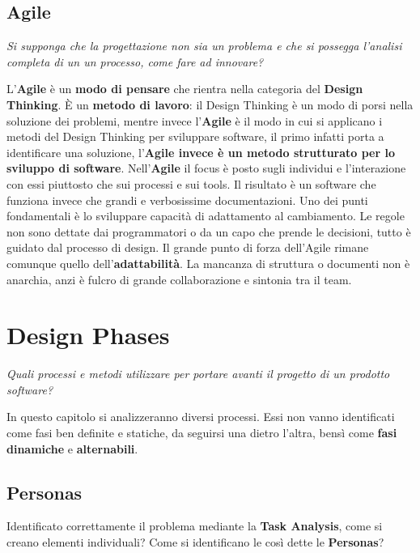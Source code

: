 \documentclass[a4paper,11pt,oneside]{book}
\begin{document}
\section{Agile}
\begin{flushleft}
	\textit{Si supponga che la progettazione non sia un problema e che si possegga l'analisi completa di un un processo, come fare ad innovare?}
\end{flushleft}
L'\textbf{Agile} è un \textbf{modo di pensare} che rientra nella categoria del \textbf{Design Thinking}.
È un \textbf{metodo di lavoro}: il Design Thinking è un modo di porsi nella soluzione dei problemi, mentre invece l'\textbf{Agile} è il modo in cui si applicano i metodi del Design Thinking per sviluppare software, il primo infatti
porta a identificare una soluzione, l'\textbf{Agile invece è un metodo strutturato per lo sviluppo di software}.
Nell'\textbf{Agile} il focus è posto sugli individui e l'interazione con essi piuttosto che sui processi e sui tools. Il risultato è un software che funziona invece che grandi  e verbosissime documentazioni. Uno dei punti fondamentali è lo sviluppare capacità di adattamento al cambiamento.
Le regole non sono dettate dai programmatori o da un capo che prende le decisioni,
tutto è guidato dal processo di design. Il grande punto di forza dell'Agile rimane comunque quello dell'\textbf{adattabilità}. La mancanza di struttura o documenti non è anarchia, anzi è fulcro di grande collaborazione e sintonia tra il team.

\pagebreak

\chapter{Design Phases}
\begin{flushleft}
	\textit{Quali processi e metodi utilizzare per portare avanti il progetto di un
		prodotto software?}
\end{flushleft}

In questo capitolo si analizzeranno diversi processi.
Essi non vanno identificati come fasi ben definite e statiche, da seguirsi una dietro l'altra, bensì come \textbf{fasi} \textbf{dinamiche} e \textbf{alternabili}.

\section{Personas}
Identificato correttamente il problema mediante la \textbf{Task Analysis}, come si  creano elementi individuali? Come si identificano le così dette le \textbf{Personas}?
\end{document}
